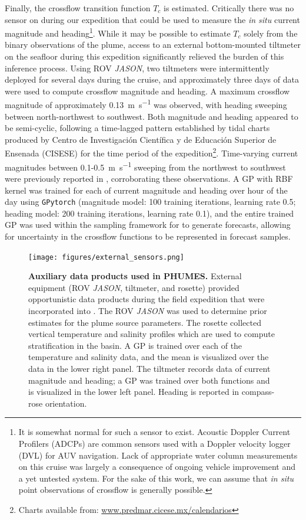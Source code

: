 Finally, the crossflow transition function $T_c$ is estimated. Critically there was no sensor on \Sentry during our expedition that could be used to measure the \emph{in situ} current magnitude and heading\footnote{It is somewhat normal for such a sensor to exist. Acoustic Doppler Current Profilers (ADCPs) are common sensors used with a Doppler velocity logger (DVL) for AUV navigation. Lack of appropriate water column measurements on this cruise was largely a consequence of ongoing vehicle improvement and a yet untested system. For the sake of this work, we can assume that \emph{in situ} point observations of crossflow is generally possible.}. While it may be possible to estimate $T_c$ solely from the binary observations of the plume, access to an external bottom-mounted tiltmeter on the seafloor during this expedition significantly relieved the burden of this inference process. Using ROV \emph{JASON}, two tiltmeters were intermittently deployed for several days during the cruise, and approximately three days of data were used to compute crossflow magnitude and heading. A maximum crossflow magnitude of approximately \SI{0.13}{\meter\per\second} was observed, with heading sweeping between north-northwest to southwest. Both magnitude and heading appeared to be semi-cyclic, following a time-lagged pattern established by tidal charts produced by Centro de Investigaci\'on Cient\'ifica y de Educaci\'on Superior de Ensenada (CISESE) for the time period of the expedition\footnote{Charts available from: \url{www.predmar.cicese.mx/calendarios}}. Time-varying current magnitudes between 0.1-\SI{0.5}{\meter\per\second} sweeping from the northwest to southwest were previously reported in \cite{scholz2019shelf}, corroborating these observations. A GP with RBF kernel was trained for each of current magnitude and heading over hour of the day using \verb|GPytorch| (magnitude model: 100 training iterations, learning rate 0.5; heading model: 200 training iterations, learning rate 0.1), and the entire trained GP was used within the sampling framework for \PHUMES to generate forecasts, allowing for uncertainty in the crossflow functions to be represented in forecast samples. 

\begin{figure}[h!]
    \centering
    \texttt{[image: figures/external\_sensors.png]}
    \caption[Auxiliary data products used in \PHUMES.]{\textbf{Auxiliary data products used in PHUMES.} External equipment (ROV \emph{JASON}, tiltmeter, and rosette) provided opportunistic data products during the field expedition that were incorporated into \PHUMES. The ROV \emph{JASON} was used to determine prior estimates for the plume source parameters. The rosette collected vertical temperature and salinity profiles which are used to compute stratification in the basin. A GP is trained over each of the temperature and salinity data, and the mean is visualized over the data in the lower right panel. The tiltmeter records data of current magnitude and heading; a GP was trained over both functions and is visualized in the lower left panel. Heading is reported in compass-rose orientation.}
    \label{fig:ext_sensors}
\end{figure}


